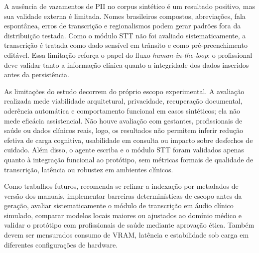 \documentclass[12pt]{article}
\begin{document}
A ausência de vazamentos de PII no corpus sintético é um resultado positivo, mas sua validade externa é limitada. Nomes brasileiros compostos, abreviações, fala espontânea, erros de transcrição e regionalismos podem gerar padrões fora da distribuição testada.
Como o módulo STT não foi avaliado sistematicamente, a transcrição é tratada como dado sensível em trânsito e como pré-preenchimento editável.
Essa limitação reforça o papel do fluxo \textit{human-in-the-loop}: o profissional deve validar tanto a informação clínica quanto a integridade dos dados inseridos antes da persistência.

As limitações do estudo decorrem do próprio escopo experimental.
A avaliação realizada mede viabilidade arquitetural, privacidade, recuperação documental, aderência automática e comportamento funcional em casos sintéticos; ela não mede eficácia assistencial. Não houve avaliação com gestantes, profissionais de saúde ou dados clínicos reais, logo, os resultados não permitem inferir redução efetiva de carga cognitiva, usabilidade em consulta ou impacto sobre desfechos de cuidado.
Além disso, o agente escriba e o módulo STT foram validados apenas quanto à integração funcional ao protótipo, sem métricas formais de qualidade de transcrição, latência ou robustez em ambientes clínicos.

Como trabalhos futuros, recomenda-se refinar a indexação por metadados de versão dos manuais, implementar barreiras determinísticas de escopo antes da geração, avaliar sistematicamente o módulo de transcrição em áudio clínico simulado, comparar modelos locais maiores ou ajustados ao domínio médico e validar o protótipo com profissionais de saúde mediante aprovação ética.
Também devem ser mensurados consumo de VRAM, latência e estabilidade sob carga em diferentes configurações de hardware.


\end{document}
